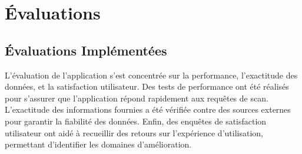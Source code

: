 \section{Évaluations}
\subsection{Évaluations Implémentées}

L'évaluation de l'application s'est concentrée sur la performance, l'exactitude des données, et la satisfaction utilisateur. Des tests de performance ont été réalisés pour s'assurer que l'application répond rapidement aux requêtes de scan. L'exactitude des informations fournies a été vérifiée contre des sources externes pour garantir la fiabilité des données. Enfin, des enquêtes de satisfaction utilisateur ont aidé à recueillir des retours sur l'expérience d'utilisation, permettant d'identifier les domaines d'amélioration.